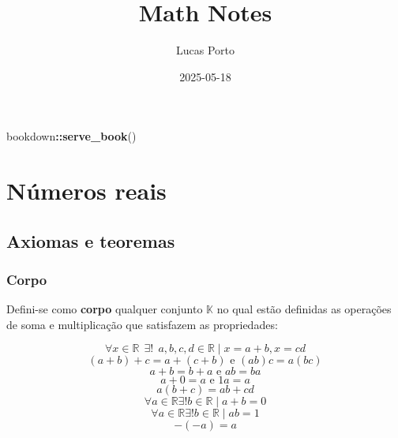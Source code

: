 \documentclass[
]{book}
\title{Math Notes}
\author{Lucas Porto}
\date{2025-05-18}
\newenvironment{Shaded}{\begin{snugshade}}{\end{snugshade}}
\newcommand{\FunctionTok}[1]{\textcolor[rgb]{0.13,0.29,0.53}{\textbf{#1}}}
\newcommand{\NormalTok}[1]{#1}
\newcommand{\SpecialCharTok}[1]{\textcolor[rgb]{0.81,0.36,0.00}{\textbf{#1}}}
\theoremstyle{definition}
\theoremstyle{definition}
\theoremstyle{definition}
\theoremstyle{definition}
\theoremstyle{remark}
\begin{document}
\maketitle

{
\setcounter{tocdepth}{1}
\tableofcontents
}
\begin{Shaded}
\begin{Highlighting}[]
\NormalTok{bookdown}\SpecialCharTok{::}\FunctionTok{serve\_book}\NormalTok{()}
\end{Highlighting}
\end{Shaded}

\chapter{Números reais}\label{nuxfameros-reais}

\section{Axiomas e teoremas}\label{axiomas-e-teoremas}

\citep{anton2000}

\subsection{Corpo}\label{corpo}

Defini-se como \textbf{corpo} qualquer conjunto \(\mathbb{K}\) no qual estão definidas as operações de soma e multiplicação que satisfazem as propriedades:

\begin{equation} 
\forall x \in \mathbb{R} ~~ \exists! ~~  a,b,c,d \in \mathbb{R} \mid x = a + b, x = cd\label{eq:ra0}
\end{equation} \begin{equation} 
(a + b) + c = a + (c + b) \text{ e } (ab)c = a(bc)\label{eq:ra1}
\end{equation} \begin{equation} 
a + b = b + a \text{ e } ab = ba\label{eq:ra2}
\end{equation} \begin{equation} 
a + 0 = a \text{ e } 1a = a\label{eq:ra3}
\end{equation} \begin{equation} 
a (b + c) = ab + cd\label{eq:ra4}
\end{equation} \begin{equation} 
\forall a \in \mathbb{R} \exists! b \in \mathbb{R} \mid a + b = 0\label{eq:ra5}
\end{equation} \begin{equation} 
\forall a \in \mathbb{R} \exists!  b \in \mathbb{R} \mid ab = 1\label{eq:ra6}
\end{equation} \begin{equation} 
-(-a) = a\label{eq:ra7}
\end{equation}
\end{document}
